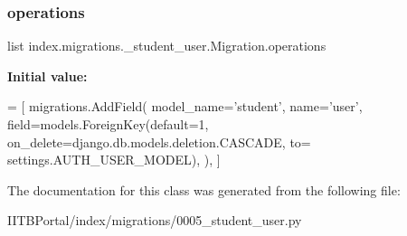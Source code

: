 \subsubsection{\texorpdfstring{operations}{operations}}
{\footnotesize\ttfamily list index.\+migrations.\+\_\+student\+\_\+user.\+Migration.\+operations\hspace{0.3cm}{\ttfamily [static]}}

{\bfseries Initial value\+:}
\begin{DoxyCode}
=  [
        migrations.AddField(
            model\_name=\textcolor{stringliteral}{'student'},
            name=\textcolor{stringliteral}{'user'},
            field=models.ForeignKey(default=1, on\_delete=django.db.models.deletion.CASCADE, to=
      settings.AUTH\_USER\_MODEL),
        ),
    ]
\end{DoxyCode}


The documentation for this class was generated from the following file\+:\begin{DoxyCompactItemize}
\item 
I\+I\+T\+B\+Portal/index/migrations/0005\+\_\+student\+\_\+user.\+py\end{DoxyCompactItemize}
